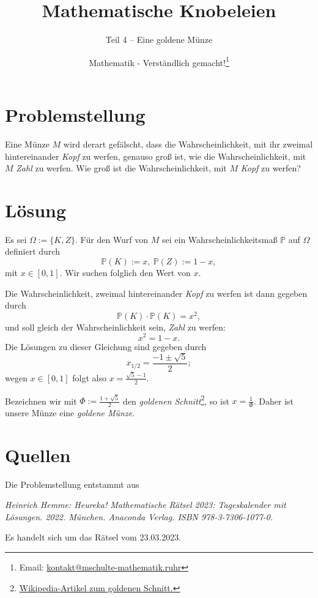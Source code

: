 \documentclass{scrartcl}
\title{Mathematische Knobeleien}
\subtitle{Teil 4 -- Eine goldene Münze}
\author{Mathematik - Verständlich gemacht!\footnote{Email: \href{mailto:kontakt@mschulte-mathematik.ruhr}{kontakt@mschulte-mathematik.ruhr}}}
\begin{document}
\maketitle

\section*{Problemstellung}
Eine Münze $M$ wird derart gefälscht, dass die 
Wahrscheinlichkeit, mit ihr zweimal hintereinander \textit{Kopf} zu 
werfen, genauso groß ist, wie die Wahrscheinlichkeit, mit $M$ 
\textit{Zahl} zu werfen. Wie groß ist die Wahrscheinlichkeit, mit 
$M$ \textit{Kopf} zu werfen?

\section*{Lösung}
Es sei $\Omega := \{K, Z\}$. Für den Wurf von $M$ sei ein
Wahrscheinlichkeitsmaß $\mathbb{P}$ auf $\Omega$ definiert durch
$$
\mathbb{P}(K) := x, ~ 
\mathbb{P}(Z) := 1-x,
$$
mit $x \in [0,1]$. Wir suchen folglich den Wert von $x$.

\noindent 
Die Wahrscheinlichkeit, zweimal hintereinander \textit{Kopf} zu
werfen ist dann gegeben durch
$$
\mathbb{P}(K) \cdot \mathbb{P}(K) = x^2,
$$
und soll gleich der Wahrscheinlichkeit sein, \textit{Zahl} zu
werfen:
$$
x^2 = 1-x.
$$
Die Lösungen zu dieser Gleichung sind gegeben durch 
$$
x_{1/2} = \frac{-1 \pm \sqrt{5}}{2};
$$
wegen $x \in [0,1]$ folgt also $x = \frac{\sqrt{5}-1}{2}$.

\noindent 
Bezeichnen wir mit $\Phi := \frac{1+\sqrt{5}}{2}$ den 
\textit{goldenen Schnitt}\footnote{
\href{https://de.wikipedia.org/wiki/Goldener_Schnitt}
{Wikipedia-Artikel zum goldenen Schnitt.}}, 
so ist $x = \frac{1}{\Phi}$. 
Daher ist unsere Münze eine \textit{goldene Münze}.

\section*{Quellen}
Die Problemstellung entstammt aus

\centering
\textit{Heinrich Hemme: Heureka! Mathematische Rätsel 2023: Tageskalender mit Lösungen.
	2022. München. Anaconda Verlag. ISBN 978-3-7306-1077-0.}

\raggedright
Es handelt sich um das Rätsel vom 23.03.2023.
\end{document}
